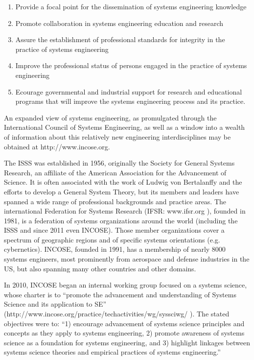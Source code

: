 \begin{enumerate}
\item Provide a focal point for the dissemination of systems engineering knowledge
\item Promote collaboration in systems engineering education and research
\item Assure the establishment of professional standards for integrity in the practice of systems engineering
\item Improve the professional status of persons engaged in the practice of systems engineering
\item Ecourage governmental and industrial support for research and educational programs that will improve the systems engineering process and its practice. 
\end{enumerate}

An expanded view of systems engineering, as promulgated through the International Council of Systems Engineering, as well as a window into a wealth of information about this relatively new engineering interdisciplines may be obtained at http://www.incose.org.

The ISSS was established in 1956, originally the Society for General Systems Research, an affiliate of the American Association for the Advancement of Science. It is often associated with the work of Ludwig von Bertalanffy and the efforts to develop a General System Theory, but its members and leaders have spanned a wide range of professional backgrounds and practice areas. The international Federation for Systems Research (IFSR: www.ifsr.org ), founded in 1981, is a federation of systems organizations around the world (including the ISSS and since 2011 even INCOSE). Those member organizations cover a spectrum of geographic regions and of specific systems orientations (e.g. cybernetics). INCOSE, founded in 1991, has a membership of nearly 8000 systems engineers, most prominently from aerospace and defense industries in the US, but also spanning many other countries and other domains.

In 2010, INCOSE began an internal working group focused on a systems science, whose charter is to “promote the advancement and understanding of Systems Science and its application to SE” (http://www.incose.org/practice/techactivities/wg/syssciwg/ ). The stated objectives were to: “1) encourage advancement of systems science principles and concepts as they apply to systems engineering, 2) promote awareness of systems science as a foundation for systems engineering, and 3) highlight linkages between systems science theories and empirical practices of systems engineering.”

